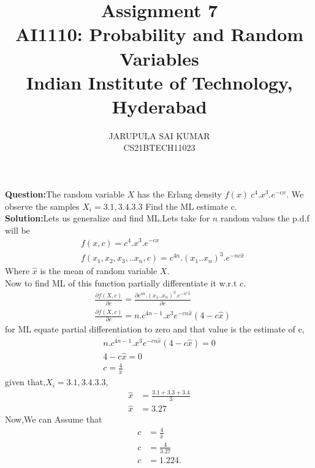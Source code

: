 \documentclass[journal,12pt,twocolumn]{IEEEtran}
\title{\textbf{Assignment 7\\ \Large AI1110: Probability and Random Variables \\ \large Indian Institute of Technology, Hyderabad}}
\author{JARUPULA SAI KUMAR \\
     CS21BTECH11023 \\}
\begin{document}
     \maketitle
     \textbf{Question:}The random variable $X$ has the Erlang density $f(x)~c^{4}.x^{3}.e^{-cx}$. We observe the samples $X_{i} = 3.1, 3.4.3.3$ Find the ML estimate c.\\
     \textbf{Solution:}Lets us generalize and find ML.Lets take for $n$
     random values the p.d.f will be
     \begin{align}
         &f(x,c)=c^{4}.x^{3}.e^{-cx}\\
         &f(x_{1},x_{2},x_{3},..x_{n},c)=c^{4n}.(x_{1}..x_{n})^{3}.e^{-nc\hat{x}}
         \end{align}
         Where $\hat{x}$ is the mean of random variable $X$.\\
         Now to find ML of this function partially differentiate it w.r.t $c$.
         \begin{align}
             &\frac{\partial f(X,c)}{\partial c}=\frac{\partial c^{4n}.(x_{1}..x_{n})^{3}.e^{-n^c\hat{x}}}{\partial c}\\
             &\frac{\partial f(X,c)}{\partial c}=n.c^{4n-1}.x^{3}e^{-cn\hat{x}}(4-c\hat{x})
         \end{align}
         for ML equate partial differentiation to zero and that value is the estimate of c,
         \begin{align}
             n.c^{4n-1}.x^{3}e^{-cn\hat{x}}(4-c\hat{x})=0\\
             4-c\hat{x}=0\\
             c=\frac{4}{\hat{x}}
         \end{align}
         given that,$X_{i} = 3.1, 3.4.3.3,$
         \begin{align}
              \hat{x}&=\frac{3.1+3.3+3.4}{3}\\
              \hat{x}&=3.27
         \end{align}
         Now,We can Assume that
         \begin{align}
         c&=\frac{4}{\hat{x}}\\
         c&=\frac{4}{3.27}\\
         c&=1.224.
         \end{align}
     
\end{document}
